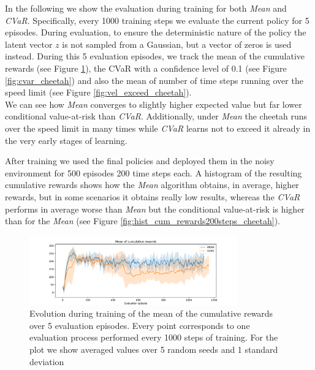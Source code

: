 In the following we show the evaluation during training for both \textit{Mean} and
\textit{CVaR}.
Specifically, every 1000 training steps we evaluate the current policy for 5 episodes.
During evaluation, to ensure the deterministic nature of the policy
the latent vector $z$ is not sampled from a Gaussian, but a vector of zeros is used instead.
During this 5 evaluation episodes, we track the mean of the cumulative rewards (see Figure \ref{fig:mean_cheetah}),
the CVaR with a confidence level of 0.1 (see Figure \ref{fig:cvar_cheetah}) and also the 
mean of number of time steps running over the speed limit (see Figure \ref{fig:vel_exceed_cheetah}).\\
We can see how \textit{Mean} converges to slightly higher
expected value but far lower conditional value-at-risk than \textit{CVaR}.
Additionally, under \textit{Mean} the cheetah runs over the speed limit in many times
while \textit{CVaR} learns not to exceed it already
in the very early stages of learning.

After training we used the final policies and deployed them in the noisy environment for 500 episodes 
200 time steps each. A histogram of the resulting cumulative rewards shows
how the \textit{Mean} algorithm obtains, in average, higher rewards, but in some scenarios it 
obtains really low results, whereas the \textit{CVaR} performs in average worse than \textit{Mean} 
but the conditional value-at-risk is higher than for the \textit{Mean} (see Figure \ref{fig:hist_cum_rewards200steps_cheetah}).



\begin{figure}[ht]
    \centering
    \includegraphics[width=0.8\textwidth]{images/Cheetah_offpolicy_medium/mean_train_withstds.pdf}
    \caption{Evolution during training of the mean of the cumulative rewards over 5 evaluation episodes. Every point corresponds
    to one evaluation process performed every 1000 steps of training. For the plot we
    show averaged values over 5 random seeds and 1 standard deviation}
    \label{fig:mean_cheetah}

\end{figure}

